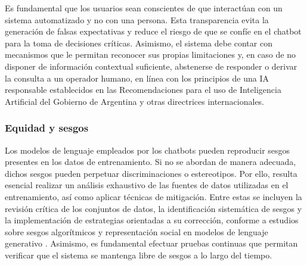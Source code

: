 Es fundamental que los usuarios sean conscientes de que interactúan con un sistema automatizado y no con una persona. Esta transparencia evita la generación de falsas expectativas y reduce el riesgo de que se confíe en el chatbot para la toma de decisiones críticas. Asimismo, el sistema debe contar con mecanismos que le permitan reconocer sus propias limitaciones y, en caso de no disponer de información contextual suficiente, abstenerse de responder o derivar la consulta a un operador humano, en línea con los principios de una IA responsable establecidos en las Recomendaciones para el uso de Inteligencia Artificial del Gobierno de Argentina \cite{argentina-enia} y otras directrices internacionales.

\subsubsection{Equidad y sesgos}

Los modelos de lenguaje empleados por los chatbots pueden reproducir sesgos presentes en los datos de entrenamiento. Si no se abordan de manera adecuada, dichos sesgos pueden perpetuar discriminaciones o estereotipos. Por ello, resulta esencial realizar un análisis exhaustivo de las fuentes de datos utilizadas en el entrenamiento, así como aplicar técnicas de mitigación. Entre estas se incluyen la revisión crítica de los conjuntos de datos, la identificación sistemática de sesgos y la implementación de estrategias orientadas a su corrección, conforme a estudios sobre sesgos algorítmicos y representación social en modelos de lenguaje generativo \cite{fundar-sesgos}. Asimismo, es fundamental efectuar pruebas continuas que permitan verificar que el sistema se mantenga libre de sesgos a lo largo del tiempo.

